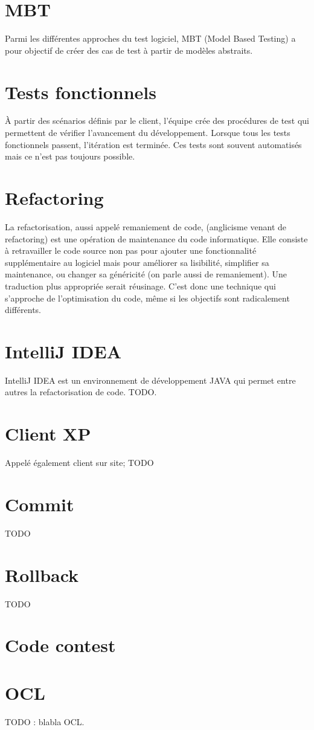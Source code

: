 \section{MBT}\label{lexique:MBT}
Parmi les différentes approches du test logiciel, MBT (Model Based Testing) a pour objectif de créer des cas de test à partir de modèles abstraits.

\section{Tests fonctionnels}\label{lexique:testsFonctionnels}
À partir des scénarios définis par le client, l'équipe crée des procédures de test qui permettent de vérifier l'avancement du développement. Lorsque tous les tests fonctionnels passent, l'itération est terminée. Ces tests sont souvent automatisés mais ce n'est pas toujours possible.

\section{Refactoring}\label{lexique:refactoring}
La refactorisation, aussi appelé remaniement de code, (anglicisme venant de refactoring) est une opération de maintenance du code informatique. Elle consiste à retravailler le code source non pas pour ajouter une fonctionnalité supplémentaire au logiciel mais pour améliorer sa lisibilité, simplifier sa maintenance, ou changer sa généricité (on parle aussi de remaniement). Une traduction plus appropriée serait réusinage. C'est donc une technique qui s'approche de l'optimisation du code, même si les objectifs sont radicalement différents. 

\section{IntelliJ IDEA}\label{lexique:IDEA}
IntelliJ IDEA est un environnement de développement JAVA qui permet entre autres la refactorisation de code.
TODO.
\section{Client XP}\label{lexique:clientXP}
Appelé également client sur site; TODO

\section{Commit}\label{lexique:commit}
TODO

\section{Rollback}\label{lexique:rollback}
TODO

\section{Code contest}\label{lexique:codeContest}

\section{OCL}\label{lexique:OCL}
TODO : blabla OCL.
